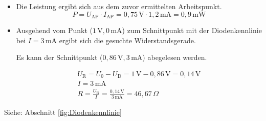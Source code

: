 {\begin{itemize}
        \item[b)]
              Die Leistung ergibt sich aus dem zuvor ermittelten Arbeitspunkt.
              \begin{equation*}
                  P = U_\text{AP} \cdot I_\text{AP} = 0,75 \, \text{V} \cdot 1,2 \, \text{mA} = 0,9 \, \text{mW}
              \end{equation*}

        \item[c)]
              Ausgehend vom Punkt ($1\,\mathrm{V}, 0\,\mathrm{mA}$) zum Schnittpunkt mit der Diodenkennlinie bei $I=3\,\mathrm{mA}$ ergibt sich die gesuchte Widerstandsgerade.

              \begin{minipage}{\linewidth}
                  \begin{figure}[H]
                      \centering
                      
                  \end{figure}
              \end{minipage}

              Es kann der Schnittpunkt ($0,86\,\mathrm{V}, 3\,\mathrm{mA}$) abegelesen werden.

              \begin{gather*}
                  U_\mathrm{R} = U_0 - U_\mathrm{D} = 1 \, \mathrm{V} - 0,86 \, \mathrm{V} = 0,14 \, \mathrm{V} \\
                  I = 3 \, \mathrm{mA} \\
                  R = \frac{U_{\text{R}}}{I} = \frac{0,14 \, \text{V}}{3 \, \text{mA}} = 46,67 \, \Omega
              \end{gather*}
    \end{itemize}
    Siehe: Abschnitt \ref{fig:Diodenkennlinie}
}